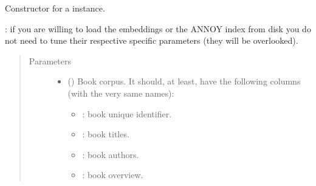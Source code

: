 \documentclass[letterpaper,10pt,english]{sphinxmanual}
\begin{document}
\begin{fulllineitems}
\begin{fulllineitems}
\label{\detokenize{code:semantic_search.SemanticSearch.__init__}}
Constructor for a  instance.

: if you are willing to load the embeddings or the ANNOY 
index from disk you do not need to tune their respective specific 
parameters (they will be overlooked).
\begin{quote}\begin{description}
\item[{Parameters}] \leavevmode\begin{itemize}
\item {} 
 () \textendash{} 
Book corpus. It should, at least, have the following columns        
(with the very same names):
\begin{itemize}
\item {} 
: book unique identifier.

\item {} 
: book titles.

\item {} 
: book authors.

\item {} 
: book overview.

\end{itemize}



\end{itemize}
\end{description}
\end{quote}
\end{fulllineitems}
\end{fulllineitems}
\end{document}
